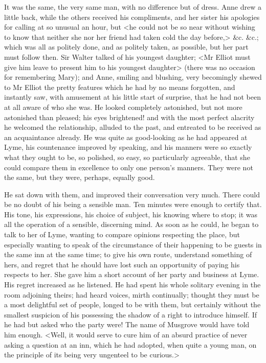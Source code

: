 It was the same, the very same man, with no difference but of dress. Anne drew a little back, while the others received his compliments, and her sister his apologies for calling at so unusual an hour, but <he could not be so near without wishing to know that neither she nor her friend had taken cold the day before,> \&c. \&c.; which was all as politely done, and as politely taken, as possible, but her part must follow then. Sir Walter talked of his youngest daughter; <Mr Elliot must give him leave to present him to his youngest daughter> (there was no occasion for remembering Mary); and Anne, smiling and blushing, very becomingly shewed to Mr Elliot the pretty features which he had by no means forgotten, and instantly saw, with amusement at his little start of surprise, that he had not been at all aware of who she was. He looked completely astonished, but not more astonished than pleased; his eyes brightened! and with the most perfect alacrity he welcomed the relationship, alluded to the past, and entreated to be received as an acquaintance already. He was quite as good-looking as he had appeared at Lyme, his countenance improved by speaking, and his manners were so exactly what they ought to be, so polished, so easy, so particularly agreeable, that she could compare them in excellence to only one person's manners. They were not the same, but they were, perhaps, equally good.

He sat down with them, and improved their conversation very much. There could be no doubt of his being a sensible man. Ten minutes were enough to certify that. His tone, his expressions, his choice of subject, his knowing where to stop; it was all the operation of a sensible, discerning mind. As soon as he could, he began to talk to her of Lyme, wanting to compare opinions respecting the place, but especially wanting to speak of the circumstance of their happening to be guests in the same inn at the same time; to give his own route, understand something of hers, and regret that he should have lost such an opportunity of paying his respects to her. She gave him a short account of her party and business at Lyme. His regret increased as he listened. He had spent his whole solitary evening in the room adjoining theirs; had heard voices, mirth continually; thought they must be a most delightful set of people, longed to be with them, but certainly without the smallest suspicion of his possessing the shadow of a right to introduce himself. If he had but asked who the party were! The name of Musgrove would have told him enough. <Well, it would serve to cure him of an absurd practice of never asking a question at an inn, which he had adopted, when quite a young man, on the principle of its being very ungenteel to be curious.>

